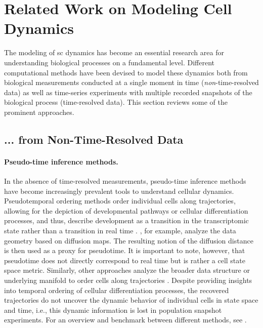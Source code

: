 \section{Related Work on Modeling Cell Dynamics}
\label{sec:related_work_bio}

The modeling of \acrlong{sc} dynamics has become an essential research area for understanding biological processes on a fundamental level. Different computational methods have been devised to model these dynamics both from biological measurements conducted at a single moment in time (\textit{non}-time-resolved data) as well as time-series experiments with multiple recorded snapshots of the biological process (time-resolved data). This section reviews some of the prominent approaches. 

\subsection*{... from Non-Time-Resolved Data}

\paragraph{Pseudo-time inference methods.}

In the absence of time-resolved measurements, pseudo-time inference methods have become increasingly prevalent tools to understand cellular dynamics.
Pseudotemporal ordering methods order individual cells along trajectories, allowing for the depiction of developmental pathways or cellular differentiation processes, and thus, describe development as a transition in the transcriptomic state rather than a transition in real time \citep{trapnell2014dynamics}. \citet{haghverdi2016diffusion}, for example, analyze the data geometry based on diffusion maps. The resulting notion of the diffusion distance is then used as a proxy for pseudotime. 
It is important to note, however, that pseudotime does not directly correspond to real time but is rather a cell state space metric.
Similarly, other approaches analyze the broader data structure or underlying manifold to order cells along trajectories \citep{qiu2017reversed, wolf2019paga, saelens2019comparison, setty2019characterization}. Despite providing insights into temporal ordering of cellular differentiation processes, the recovered trajectories do not uncover the dynamic behavior of individual cells in state space and time, i.e., this dynamic information is lost in population snapshot experiments. 
For an overview and benchmark between different methods, see \citet{saelens2019comparison, tritschler2019concepts}.

